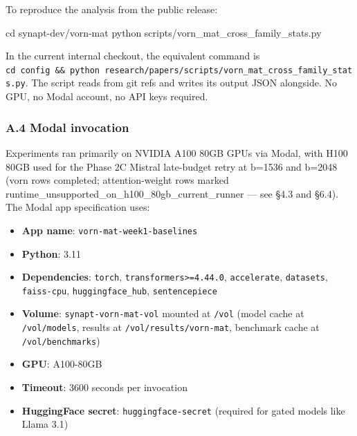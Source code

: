 \documentclass[
]{article}
\newenvironment{Shaded}{}{}
\newcommand{\BuiltInTok}[1]{\textcolor[rgb]{0.00,0.50,0.00}{#1}}
\newcommand{\ExtensionTok}[1]{#1}
\newcommand{\NormalTok}[1]{#1}
\providecommand{\tightlist}{%
  \setlength{\itemsep}{0pt}\setlength{\parskip}{0pt}}
\begin{document}
To reproduce the analysis from the public release:

\begin{Shaded}
\begin{Highlighting}[]
\BuiltInTok{cd}\NormalTok{ synapt{-}dev/vorn{-}mat}
\ExtensionTok{python}\NormalTok{ scripts/vorn\_mat\_cross\_family\_stats.py}
\end{Highlighting}
\end{Shaded}

In the current internal checkout, the equivalent command is
\texttt{cd\ config\ \&\&\ python\ research/\allowbreak{}papers/\allowbreak{}scripts/\allowbreak{}vorn\_mat\_cross\_family\_stats.\allowbreak{}py}.
The script reads from git refs and writes its output JSON alongside. No
GPU, no Modal account, no API keys required.

\subsubsection{A.4 Modal invocation}\label{a4-modal-invocation}

Experiments ran primarily on NVIDIA A100 80GB GPUs via Modal, with H100
80GB used for the Phase 2C Mistral late-budget retry at b=1536 and
b=2048 (vorn rows completed; attention-weight rows marked
runtime\_unsupported\_on\_h100\_80gb\_current\_runner --- see §4.3 and
§6.4). The Modal app specification uses:

\begin{itemize}
\tightlist
\item
  \textbf{App name}: \texttt{vorn-mat-week1-baselines}
\item
  \textbf{Python}: 3.11
\item
  \textbf{Dependencies}: \texttt{torch},
  \texttt{transformers\textgreater{}=4.44.0}, \texttt{accelerate},
  \texttt{datasets}, \texttt{faiss-cpu}, \texttt{huggingface\_hub},
  \texttt{sentencepiece}
\item
  \textbf{Volume}: \texttt{synapt-vorn-mat-vol} mounted at \texttt{/vol}
  (model cache at \texttt{/vol/models}, results at
  \texttt{/vol/results/vorn-mat}, benchmark cache at
  \texttt{/vol/benchmarks})
\item
  \textbf{GPU}: A100-80GB
\item
  \textbf{Timeout}: 3600 seconds per invocation
\item
  \textbf{HuggingFace secret}: \texttt{huggingface-secret} (required for
  gated models like Llama 3.1)
\end{itemize}
\end{document}
